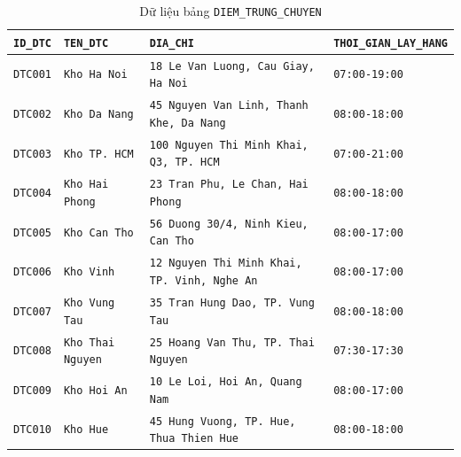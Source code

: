 \documentclass[11pt]{report}
\begin{document}
\begin{table}[H]
    \centering
    \renewcommand{\tabularxcolumn}[1]{m{#1}}
    \begin{tabularx}{\textwidth}{|>{\footnotesize}l|>{\footnotesize}l|>{\footnotesize}l|>{\raggedright\arraybackslash\footnotesize}X|} \hline
        \rowcolor{teal!30}
        \textbf{\texttt{ID\_DTC}} & \textbf{\texttt{TEN\_DTC}} & \textbf{\texttt{DIA\_CHI}} & \textbf{\texttt{THOI\_GIAN\_LAY\_HANG}} \\ \hline
        \texttt{DTC001} & \texttt{Kho Ha Noi}      & \texttt{18 Le Van Luong, Cau Giay, Ha Noi}          & \texttt{07:00-19:00} \\ \hline
        \texttt{DTC002} & \texttt{Kho Da Nang}     & \texttt{45 Nguyen Van Linh, Thanh Khe, Da Nang}     & \texttt{08:00-18:00} \\ \hline
        \texttt{DTC003} & \texttt{Kho TP. HCM}     & \texttt{100 Nguyen Thi Minh Khai, Q3, TP. HCM}      & \texttt{07:00-21:00} \\ \hline
        \texttt{DTC004} & \texttt{Kho Hai Phong}   & \texttt{23 Tran Phu, Le Chan, Hai Phong}            & \texttt{08:00-18:00} \\ \hline
        \texttt{DTC005} & \texttt{Kho Can Tho}     & \texttt{56 Duong 30/4, Ninh Kieu, Can Tho}          & \texttt{08:00-17:00} \\ \hline
        \texttt{DTC006} & \texttt{Kho Vinh}        & \texttt{12 Nguyen Thi Minh Khai, TP. Vinh, Nghe An} & \texttt{08:00-17:00} \\ \hline
        \texttt{DTC007} & \texttt{Kho Vung Tau}    & \texttt{35 Tran Hung Dao, TP. Vung Tau}             & \texttt{08:00-18:00} \\ \hline
        \texttt{DTC008} & \texttt{Kho Thai Nguyen} & \texttt{25 Hoang Van Thu, TP. Thai Nguyen}          & \texttt{07:30-17:30} \\ \hline
        \texttt{DTC009} & \texttt{Kho Hoi An}      & \texttt{10 Le Loi, Hoi An, Quang Nam}               & \texttt{08:00-17:00} \\ \hline
        \texttt{DTC010} & \texttt{Kho Hue}         & \texttt{45 Hung Vuong, TP. Hue, Thua Thien Hue}     & \texttt{08:00-18:00} \\ \hline
    \end{tabularx}
    \caption{Dữ liệu bảng \texttt{DIEM\_TRUNG\_CHUYEN}}
    \label{tab:data_dtc}
\end{table}

\end{document}
